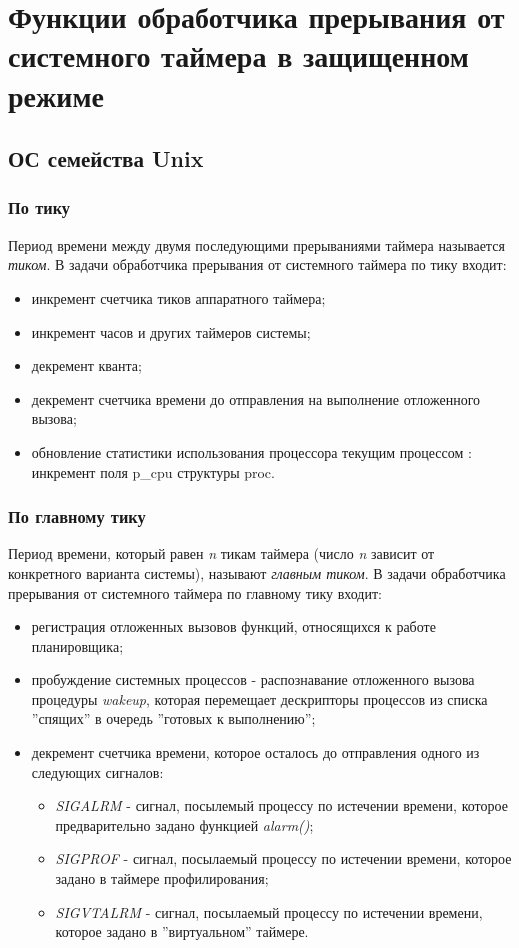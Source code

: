 \chapter{Функции обработчика прерывания от системного таймера в защищенном режиме}

\section{ОС семейства Unix}

\subsection{По тику}

Период времени между двумя последующими прерываниями таймера называется \textit{тиком}. В задачи обработчика прерывания от системного таймера по тику входит:

\begin{itemize}
	\item инкремент счетчика тиков аппаратного таймера;
	\item инкремент часов и других таймеров системы;
	\item декремент кванта;
	\item декремент счетчика времени до отправления на выполнение отложенного вызова;
	\item обновление статистики использования процессора текущим процессом : инкремент поля p\_cpu структуры proc.
\end{itemize}

\subsection{По главному тику}

Период времени, который равен \textit{n} тикам таймера (число \textit{n} зависит от конкретного варианта системы), называют \textit{главным тиком}. В задачи обработчика прерывания от системного таймера по главному тику входит:

\begin{itemize}
	\item регистрация отложенных вызовов функций, относящихся к работе планировщика;
	\item пробуждение системных процессов - распознавание отложенного вызова процедуры \textit{wakeup}, которая перемещает дескрипторы процессов из списка ''спящих'' в очередь ''готовых к выполнению'';
	\item декремент счетчика времени, которое осталось до отправления одного из следующих сигналов:
	\begin{itemize}
		\item \textit{SIGALRM} - сигнал, посылемый процессу по истечении времени, которое предварительно задано функцией \textit{alarm()};
		\item \textit{SIGPROF} - сигнал, посылаемый процессу по истечении времени, которое задано в таймере профилирования;
		\item \textit{SIGVTALRM} - сигнал, посылаемый процессу по истечении времени, которое задано в ''виртуальном'' таймере.
	\end{itemize}
\end{itemize}

